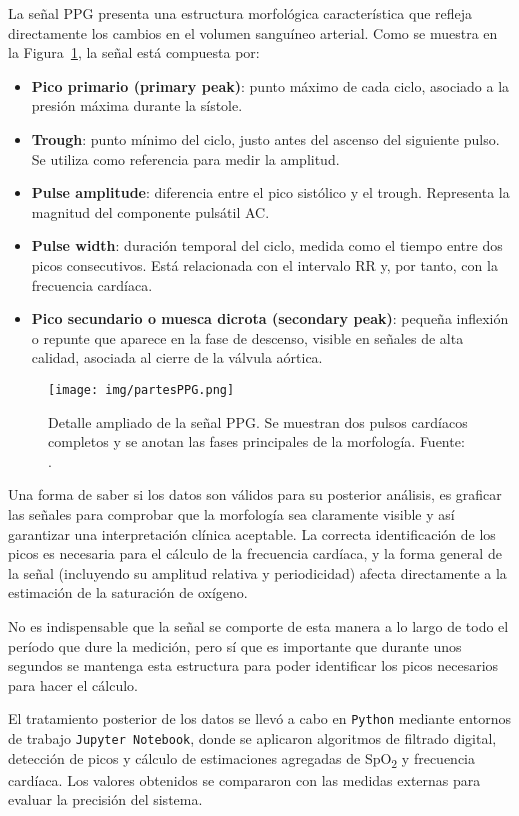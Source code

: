 La señal PPG presenta una estructura morfológica característica que refleja directamente los cambios en el volumen sanguíneo arterial. Como se muestra en la Figura~\ref{fig:ppg_partes}, la señal está compuesta por:

\begin{itemize}
    \item \textbf{Pico primario (primary peak)}: punto máximo de cada ciclo, asociado a la presión máxima durante la sístole.
    \item \textbf{Trough}: punto mínimo del ciclo, justo antes del ascenso del siguiente pulso. Se utiliza como referencia para medir la amplitud.
    \item \textbf{Pulse amplitude}: diferencia entre el pico sistólico y el trough. Representa la magnitud del componente pulsátil AC.
    \item \textbf{Pulse width}: duración temporal del ciclo, medida como el tiempo entre dos picos consecutivos. Está relacionada con el intervalo RR y, por tanto, con la frecuencia cardíaca.
    \item \textbf{Pico secundario o muesca dicrota (secondary peak)}: pequeña inflexión o repunte que aparece en la fase de descenso, visible en señales de alta calidad, asociada al cierre de la válvula aórtica.
\end{itemize}

\begin{figure}[H]
    \centering
    \texttt{[image: img/partesPPG.png]}
    \caption{Detalle ampliado de la señal PPG. Se muestran dos pulsos cardíacos completos y se anotan las fases principales de la morfología. Fuente: \cite{oximetria_medium}.}
    \label{fig:ppg_partes}
\end{figure}

Una forma de saber si los datos son válidos para su posterior análisis, es graficar las señales para comprobar que la morfología sea claramente visible y así garantizar una interpretación clínica aceptable. La correcta identificación de los picos es necesaria para el cálculo de la frecuencia cardíaca, y la forma general de la señal (incluyendo su amplitud relativa y periodicidad) afecta directamente a la estimación de la saturación de oxígeno. 

No es indispensable que la señal se comporte de esta manera a lo largo de todo el período que dure la medición, pero sí que es importante que durante unos segundos se mantenga esta estructura para poder identificar los picos necesarios para hacer el cálculo.

El tratamiento posterior de los datos se llevó a cabo en \texttt{Python} mediante entornos de trabajo \texttt{Jupyter Notebook}, donde se aplicaron algoritmos de filtrado digital, detección de picos y cálculo de estimaciones agregadas de SpO\textsubscript{2} y frecuencia cardíaca. Los valores obtenidos se compararon con las medidas externas para evaluar la precisión del sistema.


